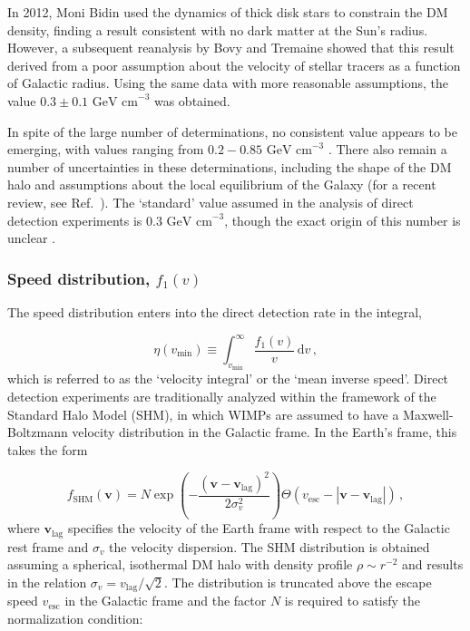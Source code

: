 In 2012, Moni Bidin \etal \cite{Moni-Bidin:2012} used the dynamics of thick disk stars to constrain the DM density, finding a result consistent with no dark matter at the Sun's radius. However, a subsequent reanalysis by Bovy and Tremaine \cite{Bovy:2012} showed that this result derived from a poor assumption about the velocity of stellar tracers as a function of Galactic radius. Using the same data with more reasonable assumptions, the value $0.3 \pm 0.1 \textrm{ GeV cm}^{-3}$ was obtained. 

In spite of the large number of determinations, no consistent value appears to be emerging, with values ranging from $0.2 - 0.85 \textrm{ GeV cm}^{-3}$ . There also remain a number of uncertainties in these determinations, including the shape of the DM halo and assumptions about the local equilibrium of the Galaxy (for a recent review, see Ref.~\cite{Read:2014}). The `standard' value assumed in the analysis of direct detection experiments is $0.3 \textrm{ GeV cm}^{-3}$, though the exact origin of this number is unclear \cite{Green:2012}. 

\subsubsection{Speed distribution, $f_1(v)$}

The speed distribution enters into the direct detection rate in the integral,

\begin{equation}
\eta(v_\textrm{min}) \equiv \int_{v_\textrm{min}}^\infty \frac{f_1(v)}{v} \, \mathrm{d}v\,,
\end{equation}
which is referred to as the `velocity integral' or the `mean inverse speed'. Direct detection experiments are traditionally analyzed within the framework of the Standard Halo Model (SHM), in which WIMPs are assumed to have a Maxwell-Boltzmann velocity distribution in the Galactic frame. In the Earth's frame, this takes the form 

\begin{equation}
\label{eq:gaussian}
f_{\textrm{SHM}}(\textbf{v}) = N \exp\left(-\frac{(\textbf{v} - \textbf{v}_\textrm{lag})^2}{2\sigma_v^2}\right) \Theta(v_\textrm{esc} - |\textbf{v} - \textbf{v}_\textrm{lag}|)\,,
\end{equation}
where $\textbf{v}_\textrm{lag}$ specifies the velocity of the Earth frame with respect to the Galactic rest frame and $\sigma_v$ the velocity dispersion. The SHM distribution is obtained assuming a spherical, isothermal DM halo with density profile $\rho \sim r^{-2}$ and results in the relation $\sigma_v = v_\textrm{lag}/\sqrt{2}$. The distribution is truncated above the escape speed $v_\textrm{esc}$ in the Galactic frame and the factor $N$ is required to satisfy the normalization condition:

